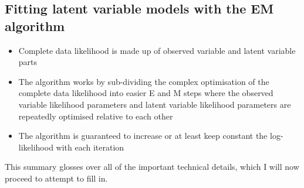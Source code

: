\documentclass{amsart}
\begin{document}
\subsection{Fitting latent variable models with the EM algorithm}
\begin{itemize}
\item Complete data likelihood is made up of observed variable and latent variable parts
\item The algorithm works by sub-dividing the complex optimisation of the complete data
likelihood into easier E and M steps where the observed variable likelihood parameters 
and latent variable likelihood parameters are repeatedly optimised relative to each 
other
\item The algorithm is guaranteed to increase or at least keep constant the log-
likelihood with each iteration
\end{itemize}


This summary glosses over all of the important technical details, which I will now
proceed to attempt to fill in.
\end{document}
